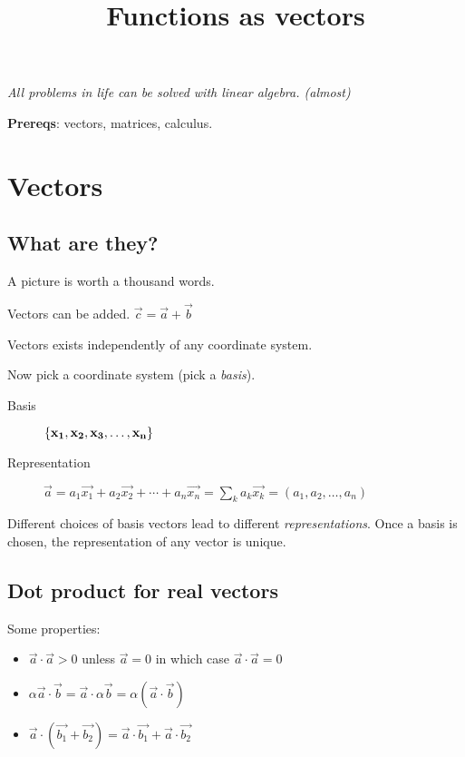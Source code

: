 \documentclass[12pt, oneside, letterpaper, fleqn]{article}
\begin{document}
\title{Functions as vectors}
\author{}
\date{\vspace{-5ex}}
\maketitle

\emph{All problems in life can be solved with linear algebra. (almost)}

\vspace{6ex}\textbf{Prereqs}: vectors, matrices, calculus.

\section{Vectors}
\subsection{What are they?}
A picture is worth a thousand words.

Vectors can be added.
$\vec{c} = \vec{a} + \vec{b}$

Vectors exists independently of any coordinate system.

Now pick a coordinate system (pick a \emph{basis}).
\begin{description}
\item[Basis] $\left\lbrace\mathbf{x_1}, \mathbf{x_2}, \mathbf{x_3}, \dotsc,
\mathbf{x_n}\right\rbrace$

\item[Representation] $\vec{a} = a_1\vec{x_1} + a_2\vec{x_2} +
\dotsb + a_n\vec{x_n} = \sum_k a_k\vec{x_k} = (a_1, a_2, \dotsc,
a_n)$
\end{description}
Different choices of basis vectors lead to different
\emph{representations}. Once a basis is chosen, the representation of
any vector is unique.

\subsection{Dot product for real vectors}
Some properties:
\begin{itemize}
\item $\vec{a} \cdot \vec{a} > 0$ unless $\vec{a} = 0$ in which case
$\vec{a} \cdot \vec{a} = 0$
\item $\alpha\vec{a} \cdot \vec{b} = \vec{a} \cdot \alpha\vec{b} =
\alpha (\vec{a} \cdot \vec{b})$
\item $\vec{a} \cdot (\vec{b_1} + \vec{b_2}) = \vec{a} \cdot \vec{b_1} +
\vec{a} \cdot \vec{b_2}$
\end{itemize}
\end{document}
